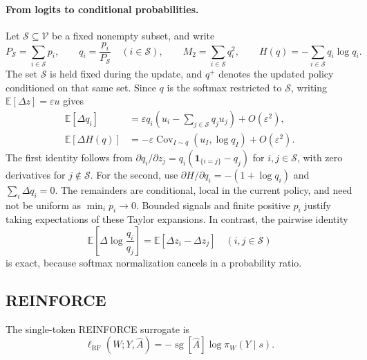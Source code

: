 \paragraph{From logits to conditional probabilities.}
Let $\mathcal S\subseteq\mathcal V$ be a fixed nonempty subset, and write
\begin{equation}
 P_{\mathcal S}=\sum_{i\in\mathcal S}p_i,\qquad
 q_i=\frac{p_i}{P_{\mathcal S}}\quad(i\in\mathcal S),\qquad
 M_2=\sum_{i\in\mathcal S}q_i^2,\qquad
 H(q)=-\sum_{i\in\mathcal S}q_i\log q_i.
 \label{eq:dyn-conditional}
\end{equation}
The set $\mathcal S$ is held fixed during the update, and $q^+$ denotes
the updated policy conditioned on that same set. Since $q$ is the softmax
restricted to $\mathcal S$, writing $\mathbb E[\Delta z]=\varepsilon u$
gives
\begin{align}
 \mathbb E[\Delta q_i]
 &=\varepsilon q_i\left(u_i-\sum_{j\in\mathcal S}q_ju_j\right)
     +O(\varepsilon^2),
 \label{eq:dyn-conditional-drift}\\
 \mathbb E[\Delta H(q)]
 &=-\varepsilon\operatorname{Cov}_{I\sim q}(u_I,\log q_I)
     +O(\varepsilon^2).
 \label{eq:dyn-entropy-drift}
\end{align}
The first identity follows from
$\partial q_i/\partial z_j=q_i(\mathbf 1_{\{i=j\}}-q_j)$ for
$i,j\in\mathcal S$, with zero derivatives for $j\notin\mathcal S$.
For the second, use $\partial H/\partial q_i=-(1+\log q_i)$ and
$\sum_i\Delta q_i=0$. The remainders are conditional, local in the
current policy, and need not be uniform as $\min_i p_i\to0$.
Bounded signals and finite positive $p_i$ justify taking expectations of
these Taylor expansions. In contrast, the pairwise identity
\begin{equation}
 \mathbb E\left[\Delta\log\frac{q_i}{q_j}\right]
 =\mathbb E[\Delta z_i-\Delta z_j]
 \quad (i,j\in\mathcal S)
 \label{eq:dyn-exact-odds}
\end{equation}
is exact, because softmax normalization cancels in a probability ratio.

\subsection{REINFORCE}
\label{app:dynamics-reinforce}

The single-token REINFORCE surrogate \citep{williams1992reinforce} is
\begin{equation}
 \ell_{\mathrm{RF}}(W;Y,\widehat A)
 =-\operatorname{sg}[\widehat A]\log\pi_W(Y\mid s).
 \label{eq:dyn-rf-loss}
\end{equation}

